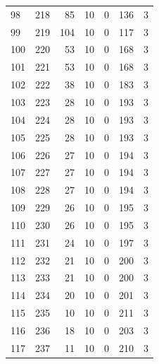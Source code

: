 \documentclass[a4paper,twoside,12pt]{book}
\begin{document}
\begin{appendices}
\begin{table}
\begin{tabular}{lrrrrrr}
		98  &    218 &        85 &        10 &               0 &             136 &         3 \\
		99  &    219 &       104 &        10 &               0 &             117 &         3 \\
		100 &    220 &        53 &        10 &               0 &             168 &         3 \\
		101 &    221 &        53 &        10 &               0 &             168 &         3 \\
		102 &    222 &        38 &        10 &               0 &             183 &         3 \\
		103 &    223 &        28 &        10 &               0 &             193 &         3 \\
		104 &    224 &        28 &        10 &               0 &             193 &         3 \\
		105 &    225 &        28 &        10 &               0 &             193 &         3 \\
		106 &    226 &        27 &        10 &               0 &             194 &         3 \\
		107 &    227 &        27 &        10 &               0 &             194 &         3 \\
		108 &    228 &        27 &        10 &               0 &             194 &         3 \\
		109 &    229 &        26 &        10 &               0 &             195 &         3 \\
		110 &    230 &        26 &        10 &               0 &             195 &         3 \\
		111 &    231 &        24 &        10 &               0 &             197 &         3 \\
		112 &    232 &        21 &        10 &               0 &             200 &         3 \\
		113 &    233 &        21 &        10 &               0 &             200 &         3 \\
		114 &    234 &        20 &        10 &               0 &             201 &         3 \\
		115 &    235 &        10 &        10 &               0 &             211 &         3 \\
		116 &    236 &        18 &        10 &               0 &             203 &         3 \\
		117 &    237 &        11 &        10 &               0 &             210 &         3 \\

\end{tabular}
\end{table}
\end{appendices}
\end{document}
